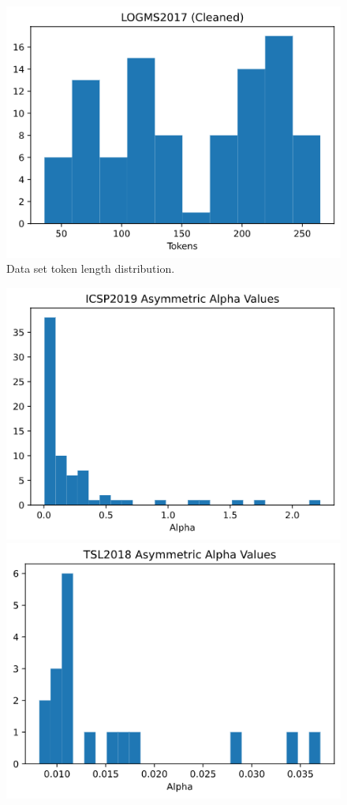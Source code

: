 \documentclass[a4paper, 12pt, twoside]{article}
\numberwithin{equation}{section} %
\begin{document}
{{\begin{appendices}
\begin{figure}[htb]
  \vspace{0.00mm}
  
   \includegraphics[width=0.65\linewidth]{LOGMS_hist.png}

\caption{Data set token length distribution.}
\end{figure}

\begin{figure}[htb]
  \centering
  \includegraphics[width=0.65\linewidth]{ICSP_alpha.png}

  \vspace{0.00mm}

  \includegraphics[width=0.65\linewidth]{TSL_alpha.png}
  

\end{figure}
\end{appendices}}}
\end{document}
